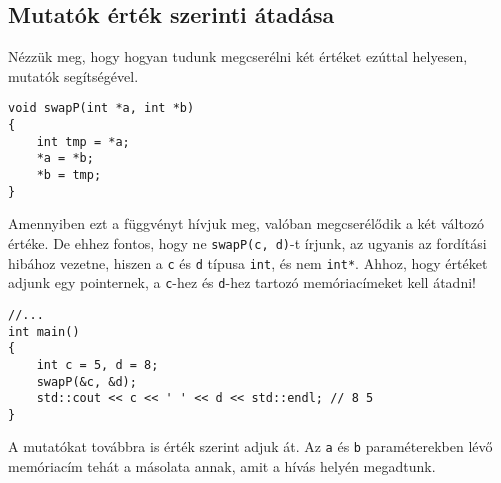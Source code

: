 \documentclass[a4paper,11.5pt,table]{article}
\begin{document}
	\subsection{Mutatók érték szerinti átadása}
  	Nézzük meg, hogy hogyan tudunk megcserélni két értéket ezúttal helyesen, mutatók segítségével.
	
	\begin{lstlisting}
void swapP(int *a, int *b)
{
	int tmp = *a;
	*a = *b;
	*b = tmp;
}
	\end{lstlisting}
	
	Amennyiben ezt a függvényt hívjuk meg, valóban megcserélődik a két változó értéke. De ehhez fontos, hogy ne \texttt{swapP(c, d)}-t írjunk, az ugyanis az fordítási hibához vezetne, hiszen a \texttt{c} és \texttt{d} típusa \texttt{int}, és nem \texttt{int*}. Ahhoz, hogy értéket adjunk egy pointernek, a \texttt{c}-hez és \texttt{d}-hez tartozó memóriacímeket kell átadni!
	\begin{lstlisting}
//...
int main()
{
	int c = 5, d = 8;
	swapP(&c, &d);
	std::cout << c << ' ' << d << std::endl; // 8 5
}
	\end{lstlisting}
	\begin{note}
    A mutatókat továbbra is érték szerint adjuk át. Az \texttt{a} és \texttt{b} paraméterekben lévő memóriacím tehát a másolata annak, amit a hívás helyén megadtunk.
	\end{note}
\end{document}
